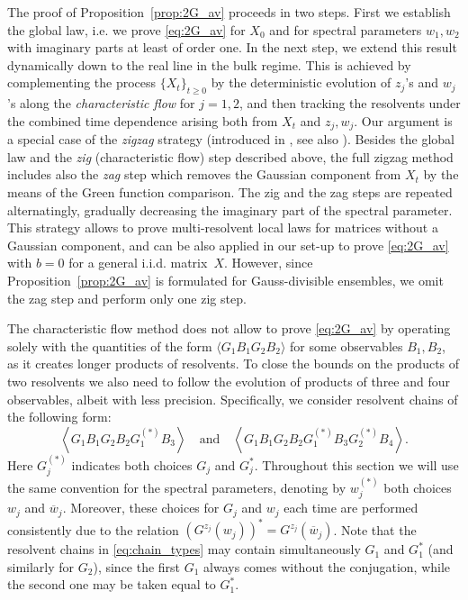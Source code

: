 \documentclass[10pt]{amsart}
\numberwithin{equation}{section}
\begin{document}
The proof of Proposition~\ref{prop:2G_av} proceeds in two steps. First we establish the global law, i.e. we prove \eqref{eq:2G_av} for $X_0$ and for spectral parameters $w_1, w_2$ with imaginary parts at least of order one. In the next step, we extend this result dynamically down to the real line in the bulk regime. This is achieved by complementing the process $\{X_t\}_{t\ge 0}$ by the deterministic evolution of $z_j$'s and $w_j$'s  along the \emph{characteristic flow} for $j=1,2$, and then tracking the resolvents under the combined time dependence arising both from $X_t$ and $z_j,w_j$. Our argument is a special case of the \emph{zigzag} strategy (introduced in \cite{cipolloni2024out}, see also \cite{Cipolloni_meso, cipolloni2023eigenstate}). Besides the global law and the \emph{zig} (characteristic flow) step described above, the full zigzag method includes also the \emph{zag} step which removes the Gaussian component from $X_t$ by the means of the Green function comparison. The zig and the zag steps are repeated alternatingly, gradually decreasing the imaginary part of the spectral parameter. This strategy allows to prove multi-resolvent local laws for matrices without a Gaussian component, and can be also applied in our set-up to prove \eqref{eq:2G_av} with $b=0$ for a general i.i.d. matrix~$X$. However, since Proposition~\ref{prop:2G_av} is formulated for Gauss-divisible ensembles, we omit the zag step and perform only one zig step.




The characteristic flow method does not allow to prove \eqref{eq:2G_av} by operating solely with the quantities of the form $\langle G_1B_1G_2B_2\rangle$ for some observables $B_1, B_2$, as it creates longer products of resolvents. To close the bounds on the products of two resolvents we also need to follow the evolution of products of three and four observables, albeit with less precision. Specifically, we consider resolvent chains of the following form:
\begin{equation}
\left\langle G_1B_1G_2B_2G_1^{(*)}B_3\right\rangle \quad \text{and}\quad \left\langle G_1B_1G_2B_2G_1^{(*)}B_3G_2^{(*)}B_4\right\rangle.
\label{eq:chain_types}
\end{equation}
Here $G_j^{(*)}$ indicates both choices $G_j$ and $G_j^*$. Throughout this section we will use the same convention for the spectral parameters, denoting by $w_j^{(*)}$ both choices $w_j$ and $\overline{w}_j$. Moreover, these choices for $G_j$ and $w_j$ each time are performed consistently due to the relation $(G^{z_j}(w_j))^*=G^{z_j}(\overline{w}_j)$. Note that the resolvent chains in \eqref{eq:chain_types} may contain simultaneously $G_1$ and $G_1^*$ (and similarly for $G_2$), since the first $G_1$ always comes without the conjugation, while the second one may be taken equal to $G_1^*$.
\end{document}
